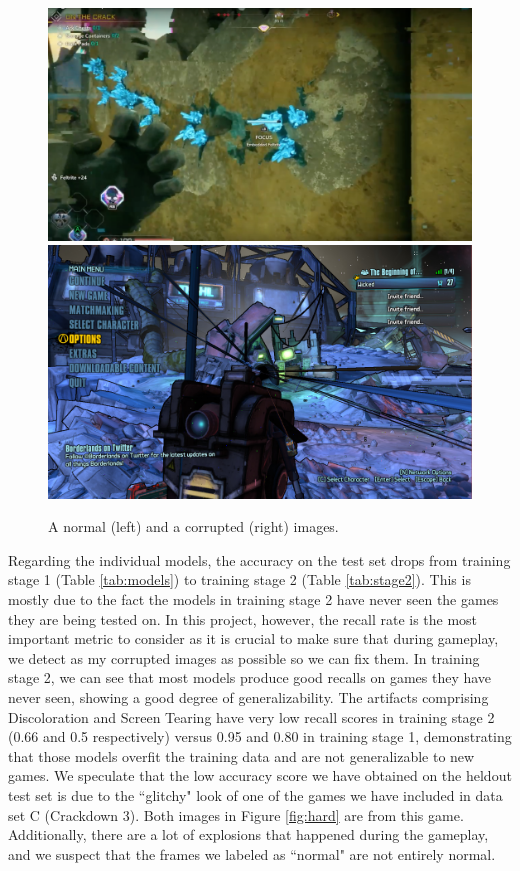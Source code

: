 \begin{figure}[H]
\centering
\includegraphics[scale=0.18]{images/corr2.png}
\includegraphics[scale=0.16]{images/shape3.jpg}\\[2ex]
\caption{A normal (left) and a corrupted (right) images.}
\label{confused}
\end{figure}

\newpage
\noindent
Regarding the individual models, the accuracy on the test set drops from training stage 1 (Table \ref{tab:models}) to training stage 2 (Table \ref{tab:stage2}). This is mostly due to the fact the models in training stage 2 have never seen the games they are being tested on. In this project, however, the recall rate is the most important metric to consider as it is crucial to make sure that during gameplay, we detect as my corrupted images as possible so we can fix them. In training stage 2, we can see that most models produce good recalls on games they have never seen, showing a good degree of generalizability. The artifacts comprising Discoloration and Screen Tearing have very low recall scores in training stage 2 (0.66 and 0.5 respectively) versus 0.95 and 0.80 in training stage 1, demonstrating that those models overfit the training data and are not generalizable to new games. We speculate that the low accuracy score we have obtained on the heldout test set is due to the ``glitchy" look of one of the games we have included in data set C (Crackdown 3). Both images in Figure \ref{fig:hard} are from this game. Additionally, there are a lot of explosions that happened during the gameplay, and we suspect that the frames we labeled as ``normal" are not entirely normal.\\

